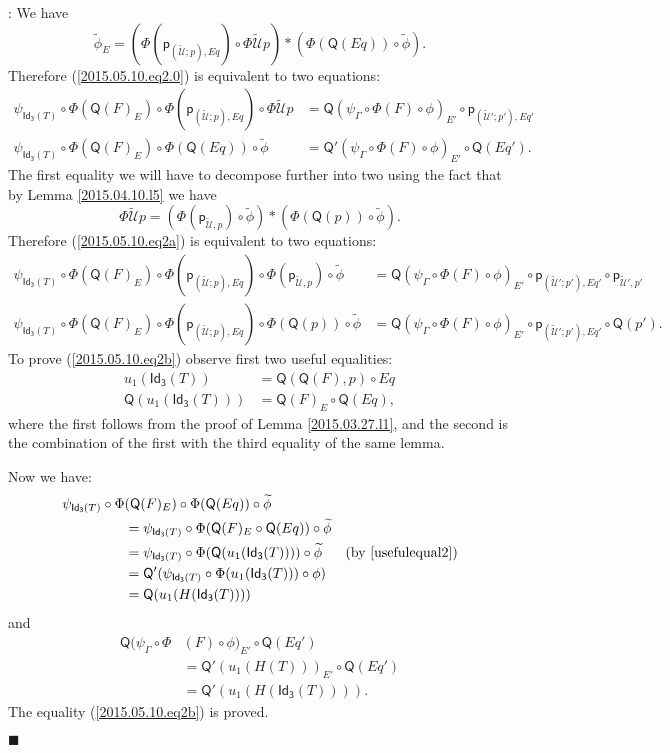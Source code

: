 \documentclass[12pt]{article}
\numberwithin{equation}{section}
\newenvironment{myproof}{{\bf Proof}:}{$\blacksquare$ \vskip 5mm }
\newcommand{\by}[1]{\text{(by #1)}}
\newcommand{\wt}{\widetilde}
\newcommand{\p}{\mathsf{p}}
\newcommand{\Idx}{\mathsf{Id_3}} %
\newcommand{\U}{\mathcal{U}}
\newcommand{\Q}{\mathsf{Q}}
\begin{document}
\begin{myproof}
We have
%
$$\wt{\phi}_E=(\Phi(\p_{(\wt{\U};p),Eq})\circ
\Phi\wt{\U}p)*(\Phi(\Q(Eq))\circ\wt{\phi}).$$
%
Therefore (\ref{2015.05.10.eq2.0}) is equivalent to two equations:
%
\begin{align}
  \psi_{\Idx(T)}\circ \Phi(\Q(F)_E)\circ \Phi(\p_{(\wt{\U};p),Eq})\circ \Phi\wt{\U}p
  & = \Q(\psi_{\Gamma}\circ \Phi(F)\circ \phi)_{E'}\circ \p_{(\wt{\U}';p'),Eq'} \label{2015.05.10.eq2a} \\
  \psi_{\Idx(T)}\circ \Phi(\Q(F)_E)\circ \Phi(\Q(Eq))\circ\wt{\phi}
  & = \Q'(\psi_{\Gamma}\circ \Phi(F)\circ \phi)_{E'}\circ \Q(Eq'). \label{2015.05.10.eq2b}
\end{align}
%
The first equality we will have to decompose further into two using the fact
that by Lemma \ref{2015.04.10.l5} we have
%
$$\Phi\wt{\U}p=(\Phi(\p_{\wt{\U},p})\circ\wt{\phi})*(\Phi(\Q(p))\circ \wt{\phi}).$$
%
Therefore (\ref{2015.05.10.eq2a}) is equivalent to two equations:
%
\begin{align}
  \psi_{\Idx(T)}\circ \Phi(\Q(F)_E)\circ \Phi(\p_{(\wt{\U};p),Eq})\circ \Phi(\p_{\wt{\U},p})\circ\wt{\phi}
  & = \Q(\psi_{\Gamma}\circ \Phi(F)\circ \phi)_{E'}\circ \p_{(\wt{\U}';p'),Eq'}\circ \p_{\wt{\U}',p'} \label{2015.05.10.eq2aa} \\
  \psi_{\Idx(T)}\circ \Phi(\Q(F)_E)\circ \Phi(\p_{(\wt{\U};p),Eq})\circ \Phi(\Q(p))\circ\wt{\phi}
  & = \Q(\psi_{\Gamma}\circ \Phi(F)\circ \phi)_{E'}\circ \p_{(\wt{\U}';p'),Eq'}\circ \Q(p'). \label{2015.05.10.eq2ab}
\end{align}
%
To prove (\ref{2015.05.10.eq2b}) observe first two useful equalities:
%
\begin{align}
  u_1(\Idx(T))&=\Q(\Q(F),p)\circ Eq \label{usefulequal1} \\
  \Q(u_1(\Idx(T)))&=\Q(F)_{E}\circ \Q(Eq), \label{usefulequal2}
\end{align}
%
where the first follows from the proof of Lemma \ref{2015.03.27.l1}, and the
second is the combination of the first with the third equality of the same
lemma.

Now we have:
%
\begin{align*}
        \psi_{\Idx(T)}\circ \Phi&(\Q(F)_E) \circ \Phi(\Q(Eq))\circ\wt{\phi} \\
    & = \psi_{\Idx(T)}\circ \Phi (\Q(F)_E  \circ \Q(Eq))     \circ\wt{\phi} \\
    & = \psi_{\Idx(T)}\circ \Phi (\Q(u_1(\Idx(T))))          \circ\wt{\phi} & \by{\ref{usefulequal2}} \\
    & = \Q'(\psi_{\Idx(T)}\circ \Phi(u_1(\Idx(T)))\circ \phi) \\
    & = \Q(u_1(H(\Idx(T))))
\end{align*}
%
and
%
\begin{align*}
  \Q(\psi_{\Gamma}\circ \Phi&(F)\circ \phi)_{E'}\circ \Q(Eq') \\
  & =\Q'(u_1(H(T)))_{E'}\circ \Q(Eq') \\
  & =\Q'(u_1(H(\Idx(T)))).
\end{align*}
%
The equality (\ref{2015.05.10.eq2b}) is proved.


\end{myproof}
\end{document}
